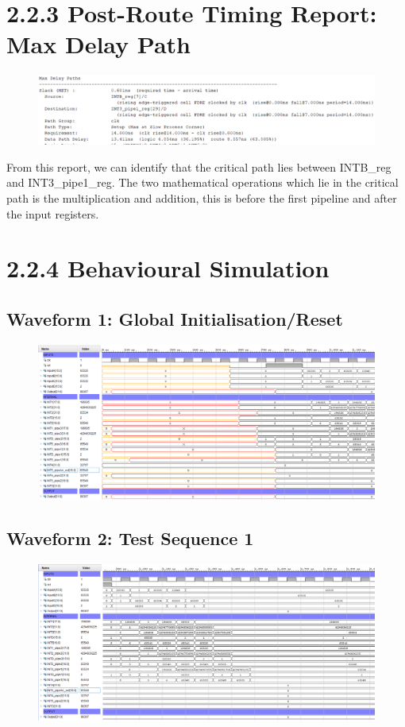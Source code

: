 \documentclass[11pt]{report}
\begin{document}
\section*{2.2.3 Post-Route Timing Report: Max Delay Path}
\begin{figure}[H]
    \includegraphics[width=\columnwidth]{Reports/Lab3/Assets/2.2.3_max-delay-path.png}
\end{figure}
From this report, we can identify that the critical path lies between INTB\_reg and INT3\_pipe1\_reg. The two mathematical operations which lie in the critical path is the multiplication and addition, this is before the first pipeline and after the input registers.

\section*{2.2.4 Behavioural Simulation}
\subsection*{Waveform 1: Global Initialisation/Reset}
\begin{figure}[H]
    \includegraphics[width=\columnwidth]{Reports/Lab3/Assets/2.2.4_waveform-initial-reset.png}
\end{figure}

\subsection*{Waveform 2: Test Sequence 1}
\begin{figure}[H]
    \includegraphics[width=\columnwidth]{Reports/Lab3/Assets/2.2.4_waveform-test-sequence-1.png}
\end{figure}
\end{document}
